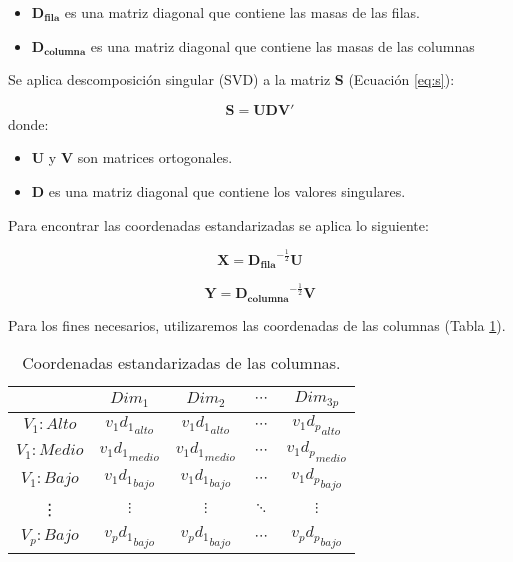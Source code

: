 \documentclass[water,article,submit,moreauthors,pdftex]{mdpi}
\providecommand{\tightlist}{%
  \setlength{\itemsep}{0pt}\setlength{\parskip}{4pt}}
\begin{document}
\begin{itemize}
\tightlist
\item
  \(\mathbf{D_{fila}}\) es una matriz diagonal que contiene las masas de
  las filas.\\
\item
  \(\mathbf{D_{columna}}\) es una matriz diagonal que contiene las masas
  de las columnas
\end{itemize}

Se aplica descomposición singular (SVD) a la matriz \textbf{S} (Ecuación
\ref{eq:s}):

\begin{equation}
\mathbf{S}=\mathbf{U}\mathbf{D}\mathbf{V'}
\label{eq:svd}
\end{equation} donde:

\begin{itemize}
\tightlist
\item
  \(\mathbf{U}\) y \(\mathbf{V}\) son matrices ortogonales.\\
\item
  \(\mathbf{D}\) es una matriz diagonal que contiene los valores
  singulares.
\end{itemize}

Para encontrar las coordenadas estandarizadas se aplica lo siguiente:

\begin{equation}
\mathbf{X}=\mathbf{D_{fila}}^{-\frac{1}{2}} \mathbf{U}
\label{eq:xcoor}
\end{equation}

\begin{equation}
\mathbf{Y}=\mathbf{D_{columna}}^{-\frac{1}{2}} \mathbf{V}
\label{eq:ycoor}
\end{equation}

Para los fines necesarios, utilizaremos las coordenadas de las columnas
(Tabla \ref{tab:colcoor}).

\begin{table}[!ht]
\begin{center}
 \begin{tabular}{|| c ||c c c c||} 
 \hline
 & $Dim_{1}$      & $Dim_{2}$ & $\cdots$ & $Dim_{3p}$ \\ [0.5ex] 
 \hline\hline
  $V_{1}:Alto$    & ${v_{1}d_{1}}_{alto}$& ${v_{1}d_{1}}_{alto}$  & $\cdots$ & ${v_{1}d_{p}}_{alto}$\\
 \hline
 $V_{1}:Medio$    &${v_{1}d_{1}}_{medio}$ & ${v_{1}d_{1}}_{medio}$ & $\cdots$ & ${v_{1}d_{p}}_{medio}$\\
\hline
 $V_{1}:Bajo$     &${v_{1}d_{1}}_{bajo}$ & ${v_{1}d_{1}}_{bajo}$  &$\cdots$ & ${v_{1}d_{p}}_{bajo}$\\
\hline
\vdots & $\vdots$ & $\vdots$  &$\ddots$& $\vdots$\\
\hline
 $V_{p}:Bajo$     &${v_{p}d_{1}}_{bajo}$ & ${v_{p}d_{1}}_{bajo}$ & $\cdots$ & ${v_{p} d_{p}} _{bajo}$ \\ [1ex] 
 \hline
\end{tabular}\caption{Coordenadas estandarizadas de las columnas.}
\label{tab:colcoor}
\end{center}
\end{table}
\end{document}
